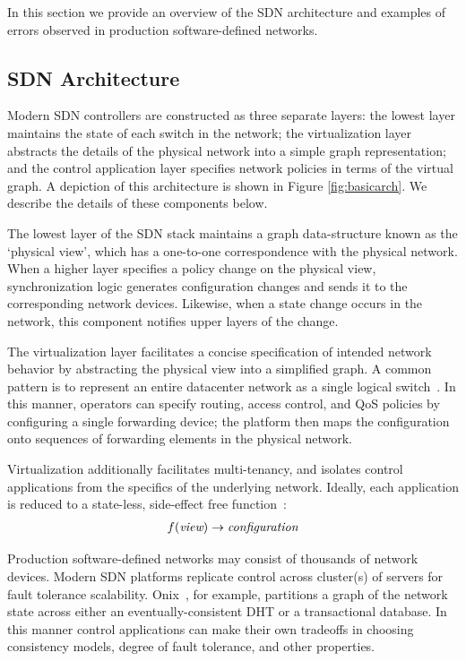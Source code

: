 In this section we provide an overview of the SDN architecture and examples 
of errors observed in production software-defined networks.

\subsection{SDN Architecture}

Modern SDN controllers are constructed as three separate layers:
the lowest layer maintains the state of each switch in the network; the virtualization layer 
abstracts the details of the physical network into a simple graph representation;
and the control application layer specifies network policies in terms of the
virtual graph. A depiction of this architecture is shown in Figure \ref{fig:basicarch}.
We describe the details of these components below.

The lowest layer of the SDN stack maintains a graph data-structure known as
the `physical view', which has a one-to-one correspondence with the physical
network. When a higher layer specifies a policy change on the physical view,
synchronization logic generates configuration changes and sends it to the
corresponding network devices. Likewise, when a state change
occurs in the network, this component notifies upper layers of the change.

The virtualization layer facilitates a concise specification of
intended network behavior by abstracting the physical view into a simplified
graph. A common pattern is to represent an entire
datacenter network as a single logical
switch~\cite{Casado:2010:VNF:1921151.1921162}. In this manner, operators
can specify routing, access control, and QoS policies by configuring a single forwarding
device; the platform then maps the configuration onto sequences 
of forwarding elements in the physical network.

Virtualization additionally facilitates multi-tenancy, and isolates control applications from the specifics
of the underlying network. Ideally, each application is reduced to a
state-less, side-effect free function~\cite{keynote}:
\begin{align*}
f(\text{\it view}) \rightarrow \text{\it configuration}
\end{align*}

Production software-defined networks may consist of thousands of network
devices. Modern SDN platforms replicate control across cluster(s) of servers
for fault tolerance scalability.
Onix~\cite{onix}, for example,
partitions a graph of the network state across either an eventually-consistent
DHT or a transactional database. In this manner control applications can make their own
tradeoffs in choosing consistency models, degree of
fault tolerance, and other properties.

